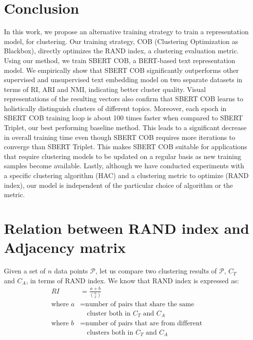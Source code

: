 \documentclass[11pt,a4paper]{article}
\begin{document}
\section{Conclusion} In this work, we propose an alternative training strategy to train a representation model, for clustering. Our training strategy, COB (Clustering Optimization as Blackbox), directly optimizes the RAND index, a clustering evaluation metric. Using our method, we train SBERT COB, a BERT-based text representation model. We empirically show that SBERT COB significantly outperforms other supervised and unsupervised text embedding model on two separate datasets in terms of RI, ARI and NMI, indicating better cluster quality. Visual representations of the resulting vectors also confirm that SBERT COB learns to holistically distinguish clusters of different topics. Moreover, each epoch in SBERT COB training loop is about 100 times faster when compared to SBERT Triplet, our best performing baseline method. This leads to a significant decrease in overall training time even though SBERT COB requires more iterations to converge than SBERT Triplet. This makes SBERT COB suitable for applications that require clustering models to be updated on a regular basis as new training samples become available. Lastly, although we have conducted experiments with a specific clustering algorithm (HAC) and a clustering metric to optimize (RAND index), our model is independent of the particular choice of algorithm or the metric.




\appendix 

\section{Relation between RAND index and Adjacency matrix} Given a set of $n$ data points $\mathcal{P}$, let us compare two clustering results of $\mathcal{P}$, $C_T$ and $C_A$, in terms of RAND index. We know that RAND index is expressed as:
\begin{align*}
    RI &= \frac{a+b}{\binom{n}{2}} \\
    \textrm{where } a &= \textrm{number of pairs that share the same} \\ 
    & \quad \textrm{cluster both in $C_T$ and $C_A$} \\
    \textrm{where } b &= \textrm{number of pairs that are from different} \\
    & \quad \textrm{clusters both in $C_T$ and $C_A$}
\end{align*}
\end{document}
